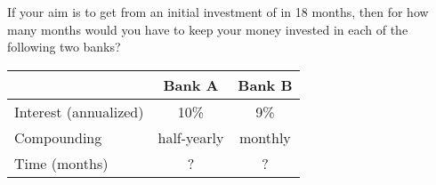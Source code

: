 
%
%
%
%
% 

\question[3] If your aim is to get  from an initial investment 
of  in 18 months, then for how many months would you have to keep
your money invested in each of the following two banks?
\begin{table}
	\begin{tabular}{lcc}
		\toprule
		& Bank A & Bank B \\
		\midrule
		Interest (annualized) & 10\% & 9\% \\
		Compounding & half-yearly & monthly \\
		Time (months) & ? & ? \\
		\bottomrule
	\end{tabular}
\end{table}

\ifprintanswers
\fi 

